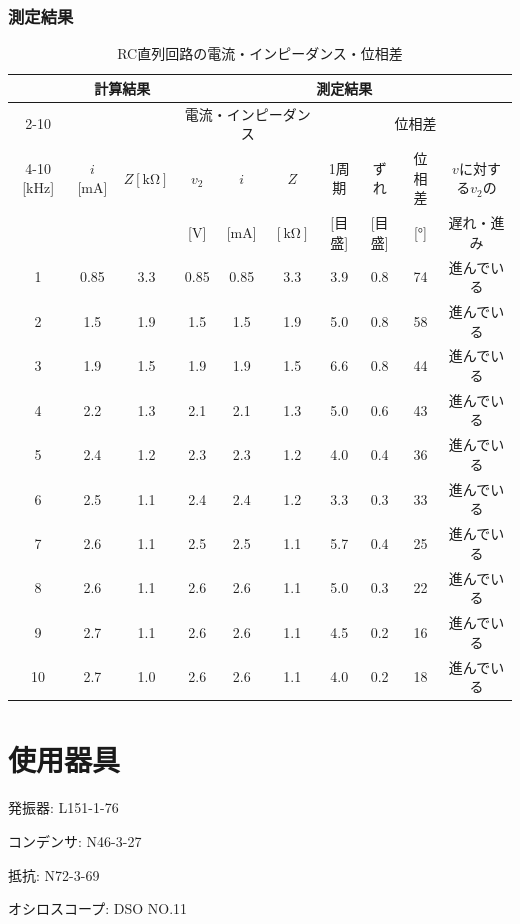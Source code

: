 \documentclass[uplatex]{jsarticle}
\begin{document}
			\subsubsection{測定結果}
				\begin{table}[h]
					\centering
					\small
					\caption{RC直列回路の電流・インピーダンス・位相差}
					\begin{tabular}{c|c|c|c|c|c|c|c|c|c}\hline\hline
						 & \multicolumn{2}{c|}{計算結果} & \multicolumn{7}{c}{測定結果} \\ \cline{2-10}
						\multicolumn{1}{c|}{周波数} & & &\multicolumn{3}{c|}{電流・インピーダンス} & \multicolumn{4}{c}{位相差} \\ \cline{4-10}
						[kHz] & $i$ [mA] & $Z [\mathrm{k\Omega}]$ & $v_{2}$ & $i$ & $Z$ & 1周期 & ずれ  & 位相差 & $v$に対する$v_{2}$の \\
						 & & & [V] & [mA] & $[\mathrm{k\Omega}]$ & [目盛] & [目盛] & [°] & 遅れ・進み \\ \hline
						1 & 0.85 & 3.3 & 0.85 & 0.85 & 3.3 & 3.9 & 0.8 & 74 & 進んでいる \\
						2 & 1.5 & 1.9 & 1.5 & 1.5 & 1.9 & 5.0 & 0.8 & 58 & 進んでいる \\
						3 & 1.9 & 1.5 & 1.9 & 1.9 & 1.5 & 6.6 & 0.8 & 44 & 進んでいる \\
						4 & 2.2 & 1.3 & 2.1 & 2.1 & 1.3 & 5.0 & 0.6 & 43 & 進んでいる \\
						5 & 2.4 & 1.2 & 2.3 & 2.3 & 1.2 & 4.0 & 0.4 & 36 & 進んでいる \\
						6 & 2.5 & 1.1 & 2.4 & 2.4 & 1.2 & 3.3 & 0.3 & 33 & 進んでいる \\
						7 & 2.6 & 1.1 & 2.5 & 2.5 & 1.1 & 5.7 & 0.4 & 25 & 進んでいる \\
						8 & 2.6 & 1.1 & 2.6 & 2.6 & 1.1 & 5.0 & 0.3 & 22 & 進んでいる \\
						9 & 2.7 & 1.1 & 2.6 & 2.6 & 1.1 & 4.5 & 0.2 & 16 & 進んでいる \\
						10 & 2.7 & 1.0 & 2.6 & 2.6 & 1.1 & 4.0 & 0.2 & 18 & 進んでいる \\ \hline
					\end{tabular}
				\end{table}
	\section{使用器具}
		発振器: L151-1-76 \par
		コンデンサ: N46-3-27 \par
		抵抗: N72-3-69 \par
		オシロスコープ: DSO NO.11
	\newpage
\end{document}
